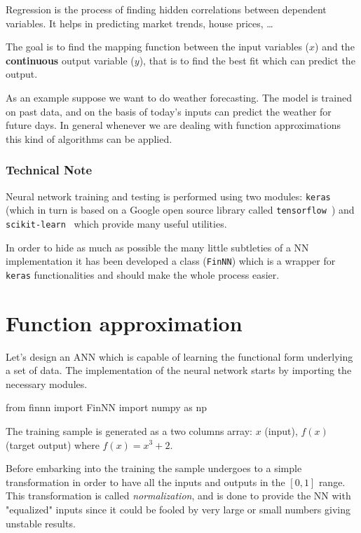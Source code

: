 Regression is the process of finding hidden correlations between dependent variables. It helps in predicting market trends, house prices, \ldots

The goal is to find the mapping function between the input variables (\(x\)) and the \textbf{continuous} output variable (\(y\)), that is to find the best fit which can predict the output.

As an example suppose we want to do weather forecasting. The model is trained on past data, and on the basis of today's inputs can predict the weather for future days. In general whenever we are dealing with function approximations this kind of algorithms can be applied.

\begin{attention}
\subsubsection{Technical Note}
\label{technical-note}

Neural network training and testing is performed using two modules: \texttt{keras}~\cite{bib:keras} (which in turn is based on a Google open source library called \texttt{tensorflow}~\cite{bib:tensorflow}) and \texttt{scikit-learn}~\cite{bib:scikit} which provide many useful utilities.

In order to hide as much as possible the many little subtleties of a NN implementation it has been developed a class (\texttt{FinNN}) which is a wrapper for \texttt{keras} functionalities and should make the whole process easier.
\end{attention}

\section{Function approximation}
\label{function-approximation}

Let's design an ANN which is capable of learning the functional form underlying a set of data. The implementation of the neural network starts by importing the necessary modules.

\begin{ipython}
from finnn import FinNN
import numpy as np
\end{ipython}

The training sample is generated as a two columns array: \(x\) (input), \(f(x)\) (target output) where \(f(x) = x^3 +2\). 

Before embarking into the training the sample undergoes to a simple transformation in order to have all the inputs and outputs in the \([0, 1]\) range. This transformation is called \emph{normalization}, and is done to provide the NN with "equalized" inputs since it could be fooled by very large or small numbers giving unstable results.

